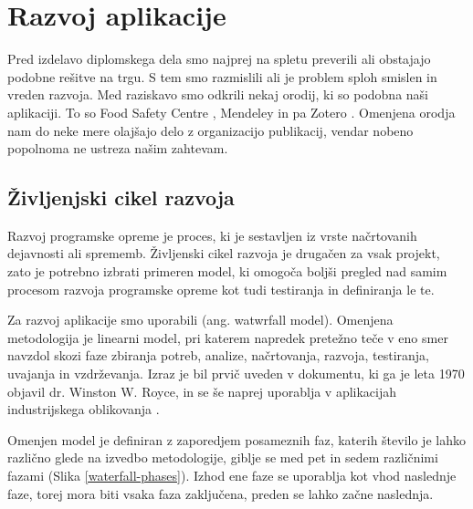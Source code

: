 \documentclass[a4paper, 12pt]{book}
\begin{document}




\chapter{Razvoj aplikacije}
\label{pregled-podrocja-chapter}

Pred izdelavo diplomskega dela smo najprej na spletu preverili ali obstajajo podobne rešitve na trgu. S tem smo razmislili ali je problem sploh smislen in vreden razvoja. Med raziskavo smo odkrili nekaj orodij, ki so podobna naši aplikaciji. To so Food Safety Centre \cite{food-safety-centre}, Mendeley \cite{mendeley-manager} in pa Zotero \cite{zotero-manager}. Omenjena orodja nam do neke mere olajšajo delo z organizacijo publikacij, vendar nobeno popolnoma ne ustreza našim zahtevam. 


\section{Življenjski cikel razvoja }
Razvoj programske opreme je proces, ki je sestavljen iz vrste načrtovanih dejavnosti ali sprememb. Življenski cikel razvoja je drugačen za vsak projekt, zato je potrebno izbrati primeren model, ki omogoča boljši pregled nad samim procesom razvoja programske opreme kot tudi testiranja in definiranja le te.

Za razvoj aplikacije smo uporabili  (ang. watwrfall model). Omenjena metodologija je linearni model, pri katerem napredek pretežno teče v eno smer navzdol skozi faze zbiranja potreb, analize, načrtovanja, razvoja, testiranja, uvajanja in vzdrževanja. Izraz je bil prvič uveden v dokumentu, ki ga je leta 1970 objavil dr. Winston W. Royce, in se še naprej uporablja v aplikacijah industrijskega oblikovanja \cite{waterfall-model}.

Omenjen model je definiran z zaporedjem posameznih faz, katerih število je lahko različno glede na izvedbo metodologije, giblje se med pet in sedem različnimi fazami (Slika \ref{waterfall-phases}). Izhod ene faze se uporablja kot vhod naslednje faze, torej mora biti vsaka faza zaključena, preden se lahko začne naslednja.
\end{document}
